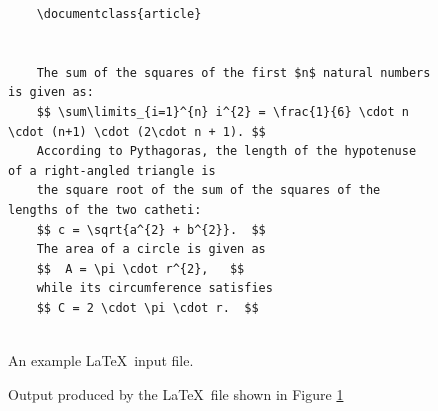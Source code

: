 \begin{figure}[!ht]
\centering
  \begin{verbatim}
    \documentclass{article}

    
    The sum of the squares of the first $n$ natural numbers is given as:
    $$ \sum\limits_{i=1}^{n} i^{2} = \frac{1}{6} \cdot n \cdot (n+1) \cdot (2\cdot n + 1). $$
    According to Pythagoras, the length of the hypotenuse of a right-angled triangle is
    the square root of the sum of the squares of the lengths of the two catheti:
    $$ c = \sqrt{a^{2} + b^{2}}.  $$
    The area of a circle is given as 
    $$  A = \pi \cdot r^{2},   $$ 
    while its circumference satisfies
    $$ C = 2 \cdot \pi \cdot r.  $$
    
\end{verbatim}
\vspace*{-0.3cm}
  \caption{An example \LaTeX\ input file.}
  \label{fig:input.tex}
\end{figure}

\begin{figure}[!ht]
  \centering
  \caption{Output produced by the \LaTeX\ file shown in Figure \ref{fig:input.tex}}
  \label{fig:input.pdf}
\end{figure}

